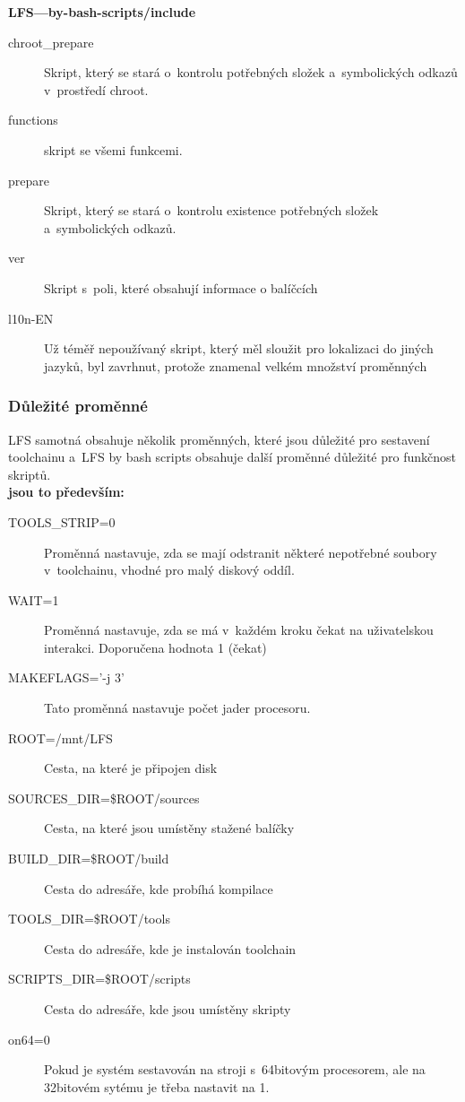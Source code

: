 \documentclass[a4paper,12pt]{article}
\renewcommand{\b}[1]{\textbf{#1}} %
\begin{document}
\b{LFS---by-bash-scripts/include}
\begin{description}
 \item[chroot\_prepare] Skript, který se stará o~kontrolu potřebných složek a~symbolických odkazů v~prostředí chroot.
 \item[functions] skript se všemi funkcemi.
 \item[prepare] Skript, který se stará o~kontrolu existence potřebných složek a~symbolických odkazů.
 \item[ver] Skript s~poli, které obsahují informace o balíčcích
 \item[l10n-EN] Už téměř nepoužívaný skript, který měl sloužit pro lokalizaci do jiných jazyků, byl zavrhnut, protože znamenal velkém množství proměnných
 \end{description}

\subsubsection{Důležité proměnné}
LFS samotná obsahuje několik proměnných, které jsou důležité pro sestavení toolchainu a~LFS by bash scripts obsahuje další proměnné důležité pro funkčnost skriptů.\\

\b{jsou to především:}
\begin{description}
 \item[TOOLS\_STRIP=0] Proměnná nastavuje, zda se mají odstranit některé nepotřebné soubory v~toolchainu, vhodné pro malý diskový oddíl.
 \item[WAIT=1] Proměnná nastavuje, zda se má v~každém kroku čekat na uživatelskou interakci. Doporučena hodnota 1 (čekat)
 \item[MAKEFLAGS='-j 3'] Tato proměnná nastavuje počet jader procesoru.
 \item[ROOT=/mnt/LFS] Cesta, na které je připojen disk
 \item[SOURCES\_DIR=\$ROOT/sources] Cesta, na které jsou umístěny stažené balíčky
 \item[BUILD\_DIR=\$ROOT/build] Cesta do adresáře, kde probíhá kompilace
 \item[TOOLS\_DIR=\$ROOT/tools] Cesta do adresáře, kde je instalován toolchain
 \item[SCRIPTS\_DIR=\$ROOT/scripts] Cesta do adresáře, kde jsou umístěny skripty
 \item[on64=0] Pokud je systém sestavován na stroji s~64bitovým procesorem, ale na 32bitovém sytému je třeba nastavit na 1.
\end{description}
\end{document}
